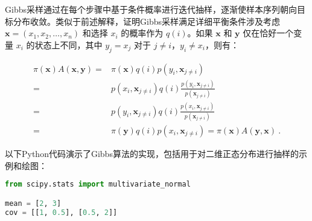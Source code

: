 Gibbs采样通过在每个步骤中基于条件概率进行迭代抽样，逐渐使样本序列朝向目标分布收敛。类似于前述解释，证明Gibbs采样满足详细平衡条件涉及考虑 $\boldsymbol x = (x_1, x_2, \dots, x_n)$ 和选择 $x_i$ 的概率作为 $q(i)$。如果 $\boldsymbol x$ 和 $\boldsymbol y$ 仅在恰好一个变量 $x_i$ 的状态上不同，其中 $y_j = x_j$ 对于 $j\neq i$，$y_i\neq x_i$，则有：

\begin{align}
\pi(\boldsymbol x) A(\boldsymbol x,\boldsymbol y) =& \pi(\boldsymbol x ) q(i) p(y_i, \boldsymbol x_{j\neq i})\\
=& p(x_i, \boldsymbol x_{j\neq i})q(i)\frac{p(y_i, \boldsymbol x_{j\neq i})}{p(\boldsymbol x_{j\neq i})}\\
=&p(y_i, \boldsymbol x_{j\neq i})q(i)\frac{p(x_i, \boldsymbol x_{j\neq i})}{p(\boldsymbol x_{j\neq i})}\\
=& \pi(\boldsymbol y ) q(i) p(x_i, \boldsymbol x_{j\neq i}) = \pi(\boldsymbol x) A(\boldsymbol y,\boldsymbol x)
~.
\end{align}

以下Python代码演示了Gibbs算法的实现，包括用于对二维正态分布进行抽样的示例和绘图：

\begin{lstlisting}[language=python]
from scipy.stats import multivariate_normal

mean = [2, 3]
cov = [[1, 0.5], [0.5, 2]]
\end{lstlisting}